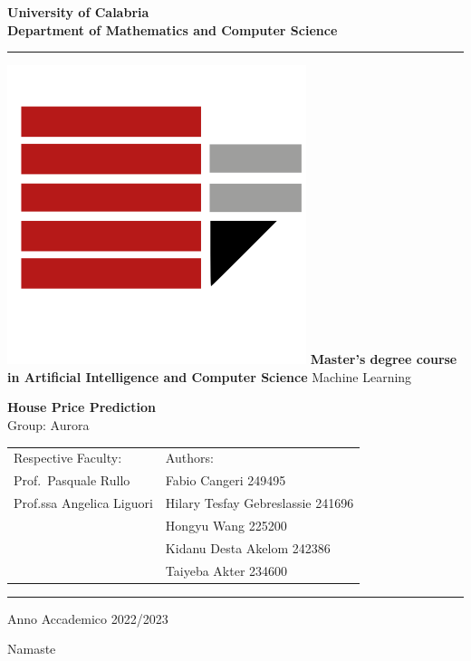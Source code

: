 \documentclass[a4paper,12pt]{report}
\newenvironment{dedication}
  {\clearpage           %
   \thispagestyle{empty}%
   \vspace*{\stretch{1}}%
   \itshape             %
   \raggedleft          %
  }
   {\par %
   \vspace{\stretch{3}} %
   \clearpage           %
  }
\begin{document}
\begin{titlepage}
\begin{center}
\textbf{\LARGE University of Calabria}\\
\textbf{Department of Mathematics and Computer Science}\\
\vskip 6pt
\hrule
\vskip 8pt
\includegraphics[width=0.13\linewidth]{logo}
\vskip 8pt
\textbf{Master’s degree course in Artificial Intelligence and Computer Science}
\vskip 32pt
Machine Learning

\vskip 70pt
{ \huge \bfseries 
    House Price Prediction  
}\\[0.4cm]
\vskip 7pt
Group: Aurora
\vskip 120pt

\begin{tabular}{p{8cm}p{6cm}}
Respective Faculty: & Authors:\\
Prof.~Pasquale Rullo & Fabio Cangeri 249495 \\
Prof.ssa Angelica Liguori & Hilary Tesfay Gebreslassie 241696 \\
 & Hongyu Wang 225200 \\
 & Kidanu Desta Akelom 242386 \\
 & Taiyeba Akter 234600 \\
\end{tabular}


\vskip 60pt
\hrule
\vskip 6pt
Anno Accademico 2022/2023
\vfill
\end{center}

\end{titlepage}

\begin{dedication}
Namaste
\end{dedication}


\end{document}

